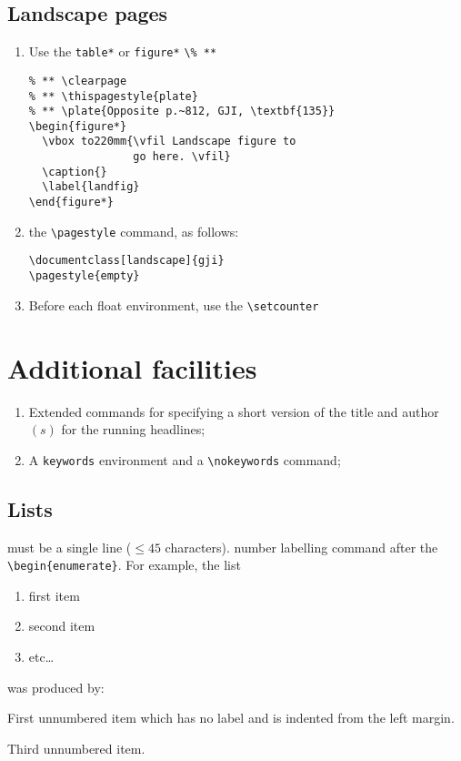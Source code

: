 \subsection{Landscape pages}\label{classoptions}

\begin{enumerate}
  \item Use the \verb"table*" or \verb"figure*"
        \verb"\% **"
\begin{verbatim}
% ** \clearpage
% ** \thispagestyle{plate}
% ** \plate{Opposite p.~812, GJI, \textbf{135}}
\begin{figure*}
  \vbox to220mm{\vfil Landscape figure to
                go here. \vfil}
  \caption{}
  \label{landfig}
\end{figure*}
\end{verbatim}
\item the \verb"\pagestyle" command, as follows:
\begin{verbatim}
\documentclass[landscape]{gji}
\pagestyle{empty}
\end{verbatim}
  \item Before each float environment, use the \verb"\setcounter"
\end{enumerate}


\section{Additional facilities}

\begin{enumerate}
  \item Extended commands for specifying a short version of the title and
        author$(s)$ for the running headlines;
  \item A \verb"keywords" environment and a \verb"\nokeywords" command;
 \end{enumerate}

\subsection{Lists}

must be a single line ($\leqslant 45$ characters).
number labelling command after the \verb"\begin{enumerate}". For example, the
list
\begin{enumerate}
\renewcommand{\theenumi}{(\arabic{enumi})}
  \item first item
  \item second item
  \item etc\ldots
\end{enumerate}
was produced by:
\begin{description}
  \item First unnumbered item which has no label and is indented from the left
        margin.
  \item Third unnumbered item.
\end{description}

